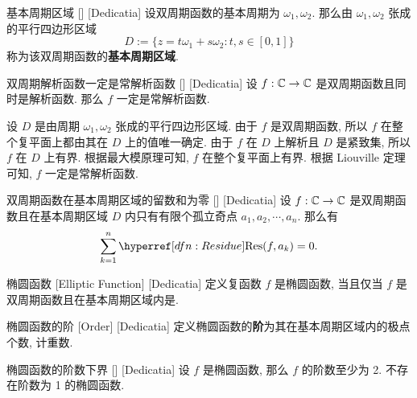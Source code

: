         \begin{dfn}
            {基本周期区域}
            []
            [Dedicatia]
            设双周期函数的基本周期为 \(\omega_1,\omega_2\). 那么由 \(\omega_1,\omega_2\) 张成的平行四边形区域
            \[D:=\{z=t\omega_1+s\omega_2:t,s\in[0,1]\}\]
            称为该双周期函数的\textbf{基本周期区域}.
        \end{dfn}

        \begin{ppt}
            {双周期解析函数一定是常解析函数}
            []
            [Dedicatia]
            设 \(f:\operatorname{\mathbb{C}}\to\operatorname{\mathbb{C}}\) 是双周期函数且同时是解析函数. 那么 \(f\) 一定是常解析函数.
        \end{ppt}

        \begin{prf}
            设 \(D\) 是由周期 \(\omega_1,\omega_2\) 张成的平行四边形区域. 由于 \(f\) 是双周期函数, 所以 \(f\) 在整个复平面上都由其在 \(D\) 上的值唯一确定. 由于 \(f\) 在 \(D\) 上解析且 \(D\) 是紧致集, 所以 \(f\) 在 \(D\) 上有界. 根据最大模原理可知, \(f\) 在整个复平面上有界. 根据 Liouville 定理可知, \(f\) 一定是常解析函数.
        \end{prf}

        \begin{ppt}
            {双周期函数在基本周期区域的留数和为零}
            []
            [Dedicatia]
            设 \(f:\operatorname{\mathbb{C}}\to\operatorname{\mathbb{C}}\) 是双周期函数且在基本周期区域 \(D\) 内只有有限个孤立奇点 \(a_1,a_2,\cdots,a_n\). 那么有
            \[\sum_{k=1}^{n}\Res(f,a_k)=0.\]
        \end{ppt}

        \begin{dfn}
            {椭圆函数}
            [Elliptic Function]
            [Dedicatia]
            定义复函数 \(f\) 是椭圆函数, 当且仅当 \(f\) 是双周期函数且在基本周期区域内是\Meromorphic{}.
        \end{dfn}

        \begin{dfn}
            {椭圆函数的阶}
            [Order]
            [Dedicatia]
            定义椭圆函数的\textbf{阶}为其在基本周期区域内的极点个数, 计重数.
        \end{dfn}

        \begin{ppt}
            {椭圆函数的阶数下界}
            []
            [Dedicatia]
            设 \(f\) 是椭圆函数, 那么 \(f\) 的阶数至少为 2. 不存在阶数为 1 的椭圆函数.
        \end{ppt}

